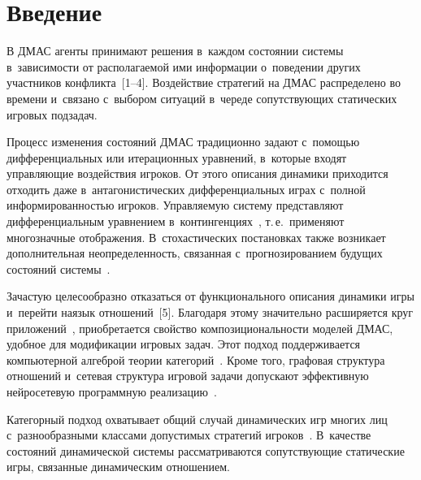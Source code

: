   



\thispagestyle{headings}

\begin{multicols}{2}

\label{st\stat}
    
\section{Введение}

    В ДМАС агенты принимают 
решения в~каждом состоянии системы в~за\-ви\-си\-мости от рас\-по\-ла\-га\-емой ими 
информации о~поведении других участников конфликта~[1--4]. Воздействие 
стратегий на ДМАС распределено во времени и~связано с~выбором ситуаций 
в~череде со\-пут\-ст\-ву\-ющих статических игровых подзадач. 
    
    Процесс изменения состояний ДМАС традиционно задают с~по\-мощью 
дифференциальных или итерационных уравнений, в~которые входят управ\-ля\-ющие 
воздействия игроков. От этого описания динамики приходится отходить даже 
в~антагонистических дифференциальных играх с~полной ин\-фор\-ми\-ро\-ван\-ностью 
игроков. Управляемую систему представляют дифференциальным уравнением 
в~контингенциях~\cite{3-vas}, т.\,е.\ применяют многозначные отоб\-ра\-же\-ния. 
В~стохастических постановках так\-же возникает дополнительная не\-опре\-де\-лен\-ность, 
связанная с~прогнозированием будущих со\-сто\-яний сис\-те\-мы~\cite{4-vas}. 
    
    Зачастую целесообразно отказаться от функционального описания динамики 
игры и~перейти на\linebreak язык отношений~[5]. Благодаря этому значительно расширяется 
круг приложений~\cite{4-vas, 6-vas, 7-vas, 8-vas, 9-vas}, приобретается свойство 
композициональности моделей ДМАС, удобное для модификации игровых \mbox{задач}. 
Этот подход поддерживается компьютерной алгеброй тео\-рии категорий~\cite{10-vas, 11-vas}. 
Кроме того, графовая структура отношений и~сетевая структура игровой задачи 
допускают эффективную нейросетевую программную реализацию~\cite{6-vas, 7-vas, 12-vas, 13-vas}. 
    
    Категорный подход охватывает общий случай динамических игр многих лиц 
    с~разнообразными классами допустимых стратегий игроков~\cite{5-vas, 11-vas}. 
В~качестве со\-сто\-яний динамической системы рассматриваются со\-пут\-ст\-ву\-ющие 
статические игры, связанные динамическим отношением.
    

\end{multicols}
